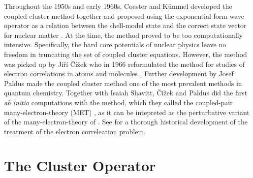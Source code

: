 Throughout the 1950s and early 1960s, Coester and Kümmel developed the coupled cluster method together and 
proposed using the exponential-form wave operator as a relation between the shell-model 
state and the correct state vector for nuclear matter \cite{coester1960short}. At the time, 
the method proved to be too computationally intensive.
Specifically, the hard core potentials 
of nuclear physics leave no freedom in truncating the set of coupled cluster equations.
However, the method was picked up by 
Ji\v{r}\'{i} \v{C}\'{i}\v{z}ek who 
in 1966 reformulated the method for studies of electron correlations in atoms and
molecules \cite{vcivzek1966correlation}. Further development by Josef Paldus
made the coupled cluster method one 
of the most prevalent methods in quantum chemistry. Together with Isaiah Shavitt,
\v{C}\'{i}\v{z}ek and Paldus did the first \emph{ab initio} computations with the method,
which they called the coupled-pair many-electron-theory (MET) \cite{paldus1972correlation},
as it can be intepreted as the perturbative variant of the many-electron-theory of 
\citeauthor{sinanoglu1964many} \cite{sinanoglu1964many}. See
\citeauthor{lowdin1995historical} \cite{lowdin1995historical}
for a thorough historical development of the treatment of the electron correleation 
problem.

\section{The Cluster Operator}

